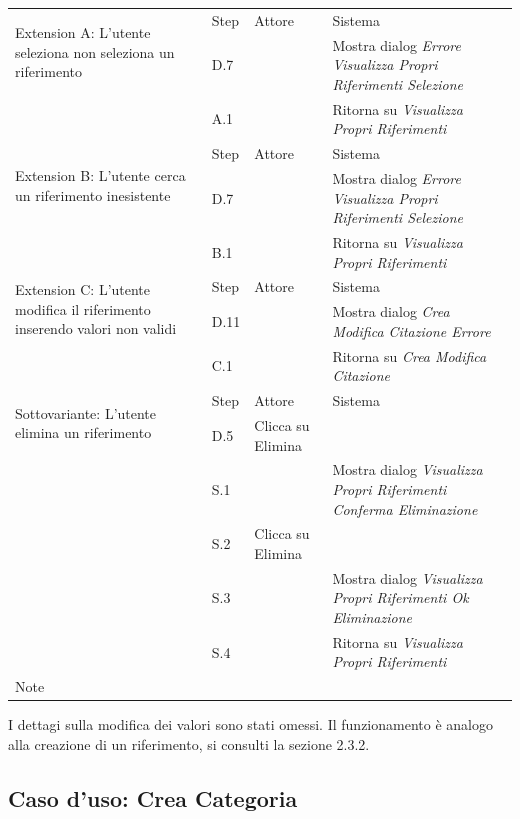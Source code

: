 \begin{table}[H]
\def\arraystretch{1.5}
\begin{tabularx}{\linewidth}{|l|X|X|X|}
 
 \hline \multirow{2}{6cm}{Extension A: L'utente seleziona non seleziona un riferimento} & Step &
  Attore & Sistema \\
 \cline{2-4} & D.7 & & Mostra dialog \textit{Errore Visualizza Propri Riferimenti Selezione} \\
 \cline{2-4} & A.1 & & Ritorna su \textit{Visualizza Propri Riferimenti} \\
 \hline
  \multirow{2}{6cm}{Extension B: L'utente cerca un riferimento inesistente} & Step & Attore & Sistema \\
 \cline{2-4} & D.7 & & Mostra dialog \textit{Errore Visualizza Propri Riferimenti Selezione} \\
 \cline{2-4} & B.1 & & Ritorna su \textit{Visualizza Propri Riferimenti} \\
 \hline

  \multirow{2}{6cm}{Extension C: L'utente modifica il riferimento inserendo valori non validi} & Step & Attore & Sistema \\
 \cline{2-4} & D.11 & & Mostra dialog \textit{Crea Modifica Citazione Errore} \\
 \cline{2-4} & C.1 & & Ritorna su \textit{Crea Modifica Citazione} \\
 \hline 

   \multirow{2}{6cm}{Sottovariante: L'utente elimina un riferimento} & Step & Attore & Sistema \\
 \cline{2-4} & D.5 & Clicca su Elimina &  \\
 \cline{2-4} & S.1 & & Mostra dialog \textit{Visualizza Propri Riferimenti Conferma Eliminazione} \\
  \cline{2-4} & S.2 & Clicca su Elimina &  \\
   \cline{2-4} & S.3 &  & Mostra dialog \textit{Visualizza Propri Riferimenti Ok Eliminazione} \\
    \cline{2-4} & S.4 &  & Ritorna su \textit{Visualizza Propri Riferimenti}  \\



 \hline 

 Note & \multicolumn{3}{l|}{} \\
 \hline

\end{tabularx}
\end{table}
I dettagi sulla modifica dei valori sono stati omessi. Il funzionamento è analogo alla creazione di un riferimento, si consulti la sezione 2.3.2.
\raggedright{\subsection{Caso d'uso: Crea Categoria}}

